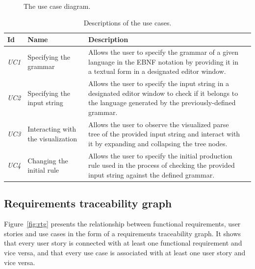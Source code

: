 \documentclass[english,bachelors,forcepolishlogotype]{wizthesis}
\begin{document}
\begin{figure}[H]
  \centering
  \resizebox{0.75\textwidth}{!}{\fontsize{9}{10}}
  \caption{The use case diagram.}
  \label{fig:use-case-diagram}
\end{figure}

\begin{xltabular}{\textwidth}{@{}lL{3cm}Xl@{}}
  \caption{Descriptions of the use cases.}
  \label{tab:use-cases}\\
  \toprule
  Id & Name & Description \\* \midrule
  \endfirsthead
  \endhead
  \endfoot
  \endlastfoot
  \emph{UC1} & Specifying the grammar & Allows the user to specify the grammar
  of a given language in the EBNF notation by providing it in a textual form in
  a designated editor window. \\
  \addlinespace[0.5em] \emph{UC2} & Specifying the input string & Allows the
  user to specify the input string in a designated editor window to check if it
  belongs to the language generated by the previously-defined grammar. \\
  \addlinespace[0.5em] \emph{UC3} & Interacting with the visualization & Allows
  the user to observe the visualized parse tree of the provided input string and
  interact with it by expanding and collapsing the tree nodes. \\
  \addlinespace[0.5em] \emph{UC4} & Changing the initial rule & Allows the user
  to specify the initial production rule used in the process of checking the
  provided input string against the defined grammar. \\* \bottomrule
\end{xltabular}

\subsection{Requirements traceability graph}

Figure~\ref{fig:rtg} presents the relationship between functional requirements,
user stories and use cases in the form of a requirements traceability graph. It
shows that every user story is connected with at least one functional
requirement and vice versa, and that every use case is associated with at least
one user story and vice versa.
\end{document}
